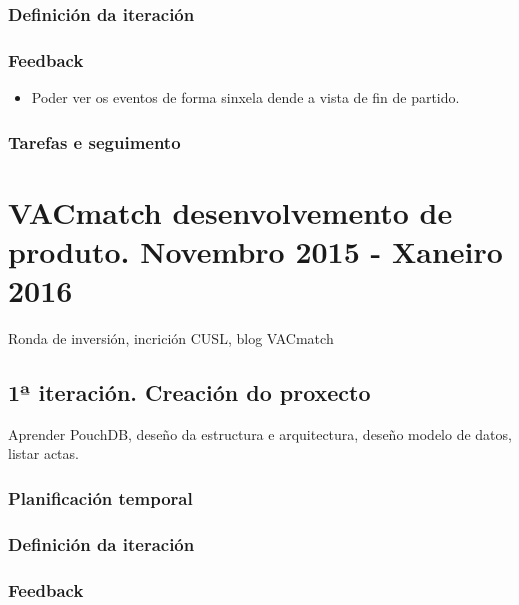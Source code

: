       \subsubsection{Definición da iteración}
      \subsubsection{Feedback}
      \begin{itemize}
      \item Poder ver os eventos de forma sinxela dende a vista de fin
        de partido.
      \end{itemize}
      \subsubsection{Tarefas e seguimento}


  \section{VACmatch desenvolvemento de produto. Novembro 2015 - Xaneiro 2016}
  Ronda de inversión, incrición CUSL, blog VACmatch


    \subsection{1ª iteración. Creación do proxecto}
    Aprender PouchDB, deseño da estructura e arquitectura, deseño modelo de datos, listar 
  actas.
      \subsubsection{Planificación temporal}
      \subsubsection{Definición da iteración}
      \subsubsection{Feedback}
